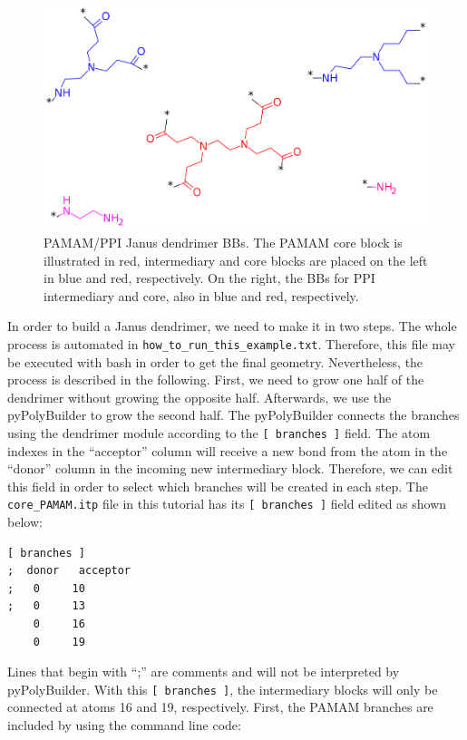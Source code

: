 \begin{figure}
    \centering
    \includegraphics[width=\textwidth]{PAMAM_PPI-Janus/JANUSBBs.png}
    \caption{PAMAM/PPI Janus dendrimer BBs. The PAMAM core block is illustrated in red, intermediary and core blocks are placed on the left in blue and red, respectively. On the right, the BBs for PPI intermediary and core, also in blue and red, respectively.}
    \label{fig:JanusBBs}
\end{figure}

In order to build a Janus dendrimer, we need to make it in two steps.
The whole process is automated in \texttt{how\_to\_run\_this\_example.txt}.
Therefore, this file may be executed with bash in order to get the final geometry.
Nevertheless, the process is described in the following.
First, we need to grow one half of the dendrimer without growing the opposite half.
Afterwards, we use the pyPolyBuilder to grow the second half.
The pyPolyBuilder connects the branches using the dendrimer module according to the \texttt{[ branches ]} field.
The atom indexes in the ``acceptor'' column will receive a new bond from the atom in the ``donor'' column in the incoming new intermediary block.
Therefore, we can edit this field in order to select which branches will be created in each step.
The \texttt{core\_PAMAM.itp} file in this tutorial has its \texttt{[ branches ]} field edited as shown below:

\begin{lstlisting}
[ branches ]
;  donor   acceptor
;   0     10
;   0     13
    0     16
    0     19
\end{lstlisting}

Lines that begin with ``;'' are comments and will not be interpreted by pyPolyBuilder.
With this \texttt{[ branches ]}, the intermediary blocks will only be connected at atoms 16 and 19, respectively.
First, the PAMAM branches are included by using the command line code:

